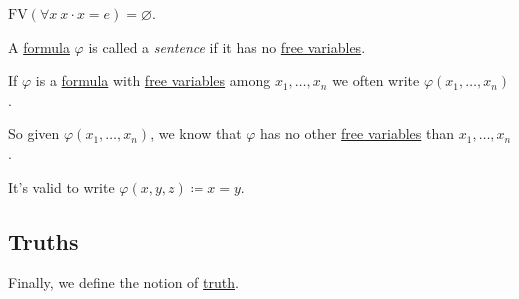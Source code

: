 \begin{eg}
	\(\mathrm{FV} (\forall x\ x\cdot x = e) = \varnothing \).
\end{eg}

\begin{definition}[Sentence]\label{def:sentence}
	A \hyperref[def:formula]{formula} \(\varphi \) is called a \emph{sentence} if it has no \hyperref[def:free-variable]{free variables}.
\end{definition}

\begin{notation}
	If \(\varphi \) is a \hyperref[def:formula]{formula} with \hyperref[def:free-variable]{free variables} among \(x_1, \ldots , x_n\) we often write \(\varphi (x_1, \ldots , x_n)\).
\end{notation}

\begin{remark}
	So given \(\varphi (x_1, \ldots , x_n)\), we know that \(\varphi \) has no other \hyperref[def:free-variable]{free variables} than \(x_1, \ldots , x_n\).
\end{remark}

\begin{eg}
	It's valid to write \(\varphi (x, y, z) \coloneqq x=y\).
\end{eg}

\subsection{Truths}
Finally, we define the notion of \hyperref[def:truth]{truth}.

